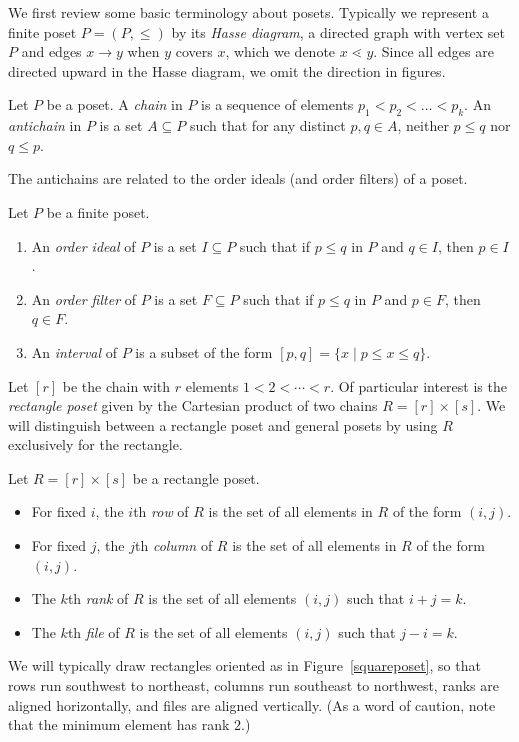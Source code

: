 \documentclass[11pt]{article}
\theoremstyle{definition}
\numberwithin{equation}{section}
\numberwithin{equation}{section}
\begin{document}
We first review some basic terminology about posets. Typically we represent a finite poset $P=(P, \leq)$ by its \emph{Hasse diagram}, a directed graph with vertex set $P$ and edges $x \to y$ when $y$ covers $x$, which we denote $x \lessdot y$. Since all edges are directed upward in the Hasse diagram, we omit the direction in figures.

\begin{Def}
Let $P$ be a poset. A \emph{chain} in $P$ is a sequence of elements $p_1 < p_2 < \dots < p_k$. An \emph{antichain} in $P$ is a set $A \subseteq P$ such that for any distinct $p,q \in A$, neither $p \leq q$ nor $q \leq p$.
\end{Def}

The antichains are related to the order ideals (and order filters) of a poset. 


\begin{Def} Let $P$ be a finite poset.
\begin{enumerate}
    \item An \emph{order ideal} of $P$ is a set $I \subseteq P$ such that if $p \leq q$ in $P$ and $q \in I$, then $p \in I$. %
    \item An \emph{order filter} of $P$ is a set $F \subseteq P$ such that if $p \leq q$ in $P$ and $p \in F$, then $q \in F$. %
    \item An \emph{interval} of $P$ is a subset of the form $[p,q]=\{ x \mid p \leq x \leq q \}$.
\end{enumerate}
\end{Def}

Let $[r]$ be the chain with $r$ elements $1 < 2 < \cdots < r$. Of particular interest is the \emph{rectangle poset} given by the Cartesian product of two chains $R = [r] \times [s]$. We will distinguish between a rectangle poset and general posets by using $R$ exclusively for the rectangle. 

\begin{Def}
Let $R = [r] \times [s]$ be a rectangle poset.
\begin{itemize}
    \item For fixed $i$, the $i$th \emph{row} of $R$ is the set of all elements in $R$ of the form $(i,j)$. 
    \item For fixed $j$, the $j$th \emph{column} of $R$ is the set of all elements in $R$ of the form $(i,j)$. 
    \item The $k$th \emph{rank} of $R$ is the set of all elements $(i,j)$ such that $i+j=k$.
    \item The $k$th \emph{file} of $R$ is the set of all elements $(i,j)$ such that $j-i=k$.
\end{itemize}
\end{Def}
We will typically draw rectangles oriented as in Figure~\ref{squareposet}, so that rows run southwest to northeast, columns run southeast to northwest, ranks are aligned horizontally, and files are aligned vertically. (As a word of caution, note that the minimum element has rank $2$.)
\end{document}
